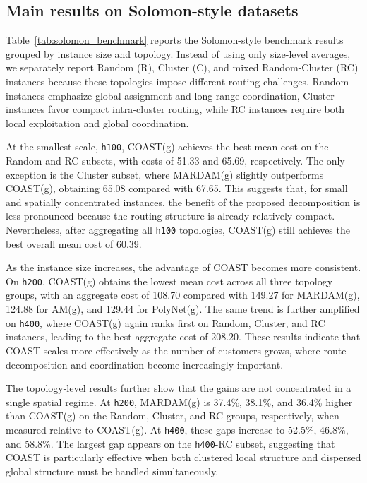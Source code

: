 \documentclass[letterpaper]{article}
\begin{document}
\subsection{Main results on Solomon-style datasets}

Table~\ref{tab:solomon_benchmark} reports the Solomon-style benchmark results grouped by instance size and topology. Instead of using only size-level averages, we separately report Random (R), Cluster (C), and mixed Random-Cluster (RC) instances because these topologies impose different routing challenges. Random instances emphasize global assignment and long-range coordination, Cluster instances favor compact intra-cluster routing, while RC instances require both local exploitation and global coordination.

At the smallest scale, \texttt{h100}, COAST(g) achieves the best mean cost on the Random and RC subsets, with costs of 51.33 and 65.69, respectively. The only exception is the Cluster subset, where MARDAM(g) slightly outperforms COAST(g), obtaining 65.08 compared with 67.65. This suggests that, for small and spatially concentrated instances, the benefit of the proposed decomposition is less pronounced because the routing structure is already relatively compact. Nevertheless, after aggregating all \texttt{h100} topologies, COAST(g) still achieves the best overall mean cost of 60.39.

As the instance size increases, the advantage of COAST becomes more consistent. On \texttt{h200}, COAST(g) obtains the lowest mean cost across all three topology groups, with an aggregate cost of 108.70 compared with 149.27 for MARDAM(g), 124.88 for AM(g), and 129.44 for PolyNet(g). The same trend is further amplified on \texttt{h400}, where COAST(g) again ranks first on Random, Cluster, and RC instances, leading to the best aggregate cost of 208.20. These results indicate that COAST scales more effectively as the number of customers grows, where route decomposition and coordination become increasingly important.

The topology-level results further show that the gains are not concentrated in a single spatial regime. At \texttt{h200}, MARDAM(g) is 37.4\%, 38.1\%, and 36.4\% higher than COAST(g) on the Random, Cluster, and RC groups, respectively, when measured relative to COAST(g). At \texttt{h400}, these gaps increase to 52.5\%, 46.8\%, and 58.8\%. The largest gap appears on the \texttt{h400}-RC subset, suggesting that COAST is particularly effective when both clustered local structure and dispersed global structure must be handled simultaneously.
\end{document}
